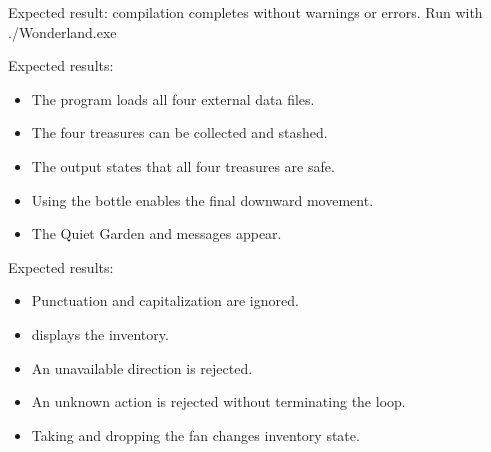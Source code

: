 \documentclass[letterpaper,10pt,english]{sphinxmanual}
\begin{document}
\sphinxAtStartPar
Expected result: compilation completes without warnings or errors. Run with ./Wonderland.exe

\begin{sphinxVerbatim}[commandchars=\\\{\}]
     
\end{sphinxVerbatim}

\sphinxAtStartPar
Expected results:
\begin{itemize}
\item {} 
\sphinxAtStartPar
The program loads all four external data files.

\item {} 
\sphinxAtStartPar
The four treasures can be collected and stashed.

\item {} 
\sphinxAtStartPar
The output states that all four treasures are safe.

\item {} 
\sphinxAtStartPar
Using the bottle enables the final downward movement.

\item {} 
\sphinxAtStartPar
The Quiet Garden and  messages appear.

\end{itemize}

\begin{sphinxVerbatim}[commandchars=\\\{\}]
     
\end{sphinxVerbatim}

\sphinxAtStartPar
Expected results:
\begin{itemize}
\item {} 
\sphinxAtStartPar
Punctuation and capitalization are ignored.

\item {} 
\sphinxAtStartPar
{} displays the inventory.

\item {} 
\sphinxAtStartPar
An unavailable direction is rejected.

\item {} 
\sphinxAtStartPar
An unknown action is rejected without terminating the loop.

\item {} 
\sphinxAtStartPar
Taking and dropping the fan changes inventory state.

\end{itemize}
\end{document}
